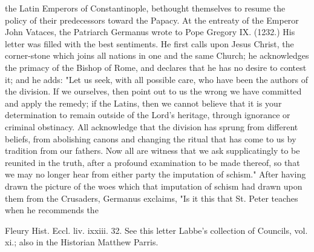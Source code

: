 the Latin Emperors of Constantinople, bethought themselves to resume the policy of their predecessors toward the Papacy. At the entreaty of the Emperor John Vataces, the Patriarch Germanus wrote to Pope Gregory IX. (1232.) His letter was filled with the best sentiments. He first calls upon Jesus Christ, the corner-stone which joins all nations in one and the same Church; he acknowledges the primacy of the Bishop of Rome, and declares that he has no desire to contest it; and he adds: "Let us seek, with all possible care, who have been the authors of the division. If we ourselves, then point out to us the wrong we have committed and apply the remedy; if the Latins, then we cannot believe that it is your determination to remain outside of the Lord's heritage, through ignorance or criminal obstinacy. All acknowledge that the division has sprung from different beliefs, from abolishing canons and changing the ritual that has come to us by tradition from our fathers. Now all are witness that we ask supplicatingly to be reunited in the truth, after a profound examination to be made thereof, so that we may no longer hear from either party the imputation of schism." After having drawn the picture of the woes which that imputation of schism had drawn upon them from the Crusaders, Germanus exclaims, "Is it this that St. Peter teaches when he recommends the

Fleury Hist. Eccl. liv. ixxiii. 32. See this letter Labbe’s collection of Councils, vol. xi.; also in the Historian Matthew Parris.

